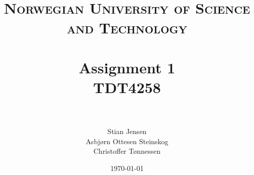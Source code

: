 \documentclass[paper=a4, fontsize=11pt]{scrartcl} %
\title{ 
\normalfont \normalsize 
\textsc{Norwegian University of Science and Technology} \\ [25pt] %
\horrule{0.5pt} \\[0.4cm] %
\huge \textbf{Assignment 1} \\ %
TDT4258 \\
\horrule{2pt} \\[0.5cm] %
}
\author{Stian Jensen\\Asbjørn Ottesen Steinskog\\Christoffer Tønnessen}
\date{\normalsize\today}
\numberwithin{equation}{section} %
\numberwithin{figure}{section} %
\numberwithin{table}{section} %
\begin{document}

\maketitle

\newpage



\newpage

\tableofcontents

\setcounter{secnumdepth}{3}

\newpage




\newpage



\newpage



\newpage



\newpage



\newpage



\newpage

\begin{alphasection}


\newpage



\end{alphasection}
\end{document}
